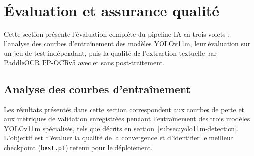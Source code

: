\section{Évaluation et assurance qualité}
\label{sec:evaluation-qualite}

Cette section présente l'évaluation complète du pipeline IA en trois volets : l'analyse des courbes d'entraînement des modèles YOLOv11m, leur évaluation sur un jeu de test indépendant, puis la qualité de l'extraction textuelle par PaddleOCR PP-OCRv5 avec et sans post-traitement.

\subsection{Analyse des courbes d'entraînement}
\label{subsec:courbes-entrainement}

Les résultats présentés dans cette section correspondent aux courbes de perte et aux métriques de validation enregistrées pendant l'entraînement des trois modèles YOLOv11m spécialisés, tels que décrits en section~\ref{subsec:yolo11m-detection}. L'objectif est d'évaluer la qualité de la convergence et d'identifier le meilleur checkpoint (\texttt{best.pt}) retenu pour le déploiement.

